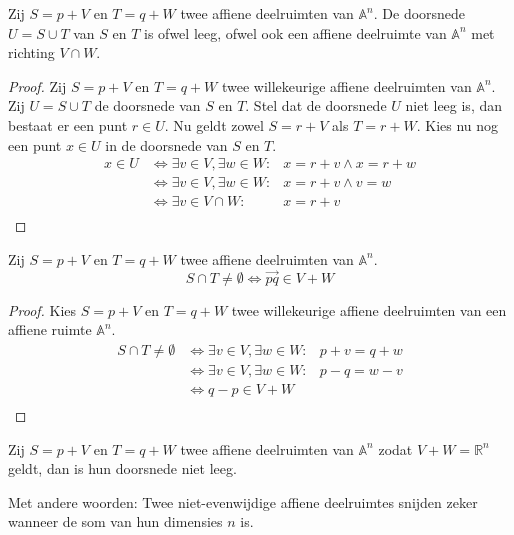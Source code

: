 \documentclass[main.tex]{subfiles}
\begin{document}
\begin{st}
\label{st:affiene-doorsnede-ruimte}
  Zij $S = p + V$ en $T = q + W$ twee affiene deelruimten van $\mathbb{A}^{n}$.
  De doorsnede $U = S \cup T$ van $S$ en $T$ is ofwel leeg, ofwel ook een affiene deelruimte van $\mathbb{A}^{n}$ met richting $V \cap W$.

  \begin{proof}
    Zij $S = p + V$ en $T = q + W$ twee willekeurige affiene deelruimten van $\mathbb{A}^{n}$.
    Zij $U = S \cup T$ de doorsnede van $S$ en $T$.
    Stel dat de doorsnede $U$ niet leeg is, dan bestaat er een punt $r \in U$. Nu geldt zowel $S = r + V$ als $T = r + W$. Kies nu nog een punt $x \in U$ in de doorsnede van $S$ en $T$.
    \[
    \begin{array}{cll}
      x \in U &\Leftrightarrow \exists v \in V, \exists w \in W:& x = r + v \wedge x = r + w\\
              &\Leftrightarrow \exists v \in V, \exists w \in W:& x = r + v \wedge v = w\\
              &\Leftrightarrow \exists v \in V \cap W:& x = r + v\\
    \end{array}
    \]
  \end{proof}
\end{st}


\begin{st}
  Zij $S = p + V$ en $T = q + W$ twee affiene deelruimten van $\mathbb{A}^{n}$.
  \[ S \cap T \neq \emptyset \Leftrightarrow \overrightarrow{pq} \in V + W \]

  \begin{proof}
    Kies $S = p + V$ en $T = q + W$ twee willekeurige affiene deelruimten van een affiene ruimte $\mathbb{A}^{n}$.
    \[
    \begin{array}{cll}
      S \cap T \neq \emptyset &\Leftrightarrow \exists v \in V, \exists w \in W:& p + v = q + w\\
                              &\Leftrightarrow \exists v \in V, \exists w \in W:& p - q = w - v\\
                              &\Leftrightarrow q - p \in V + W\\
    \end{array}
    \]
  \end{proof}
\end{st}

\begin{gev}
  Zij $S = p + V$ en $T = q + W$ twee affiene deelruimten van $\mathbb{A}^{n}$ zodat $V + W = \mathbb{R}^{n}$ geldt, dan is hun doorsnede niet leeg.

  Met andere woorden: Twee niet-evenwijdige affiene deelruimtes snijden zeker wanneer de som van hun dimensies $n$ is.
\end{gev}
\end{document}
